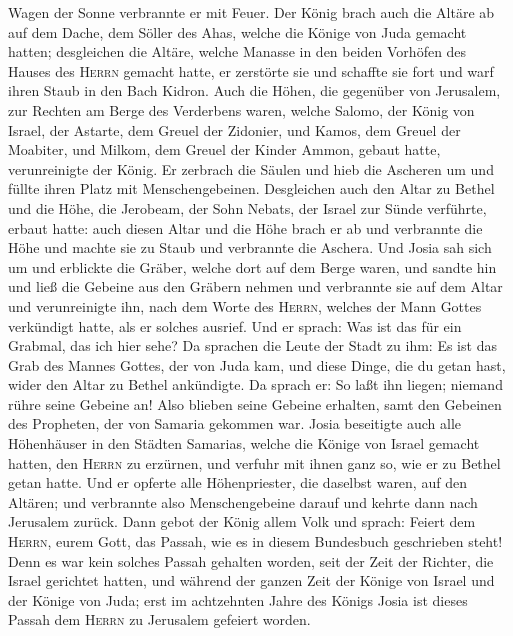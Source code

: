 Wagen der Sonne verbrannte er mit Feuer.  Der König brach
auch die Altäre ab auf dem Dache, dem Söller des Ahas, welche die Könige
von Juda gemacht hatten; desgleichen die Altäre, welche Manasse in den
beiden Vorhöfen des Hauses des \textsc{Herrn} gemacht hatte, er
zerstörte sie und schaffte sie fort und warf ihren Staub in den Bach
Kidron.  Auch die Höhen, die gegenüber von Jerusalem, zur
Rechten am Berge des Verderbens waren, welche Salomo, der König von
Israel, der Astarte, dem Greuel der Zidonier, und Kamos, dem Greuel der
Moabiter, und Milkom, dem Greuel der Kinder Ammon, gebaut hatte,
verunreinigte der König.  Er zerbrach die Säulen und hieb
die Ascheren um und füllte ihren Platz mit Menschengebeinen.
 Desgleichen auch den Altar zu Bethel und die Höhe, die
Jerobeam, der Sohn Nebats, der Israel zur Sünde verführte, erbaut hatte:
auch diesen Altar und die Höhe brach er ab und verbrannte die Höhe und
machte sie zu Staub und verbrannte die Aschera.  Und
Josia sah sich um und erblickte die Gräber, welche dort auf dem Berge
waren, und sandte hin und ließ die Gebeine aus den Gräbern nehmen und
verbrannte sie auf dem Altar und verunreinigte ihn, nach dem Worte des
\textsc{Herrn}, welches der Mann Gottes verkündigt hatte, als er solches
ausrief.  Und er sprach: Was ist das für ein Grabmal, das
ich hier sehe? Da sprachen die Leute der Stadt zu ihm: Es ist das Grab
des Mannes Gottes, der von Juda kam, und diese Dinge, die du getan hast,
wider den Altar zu Bethel ankündigte.  Da sprach er: So
laßt ihn liegen; niemand rühre seine Gebeine an! Also blieben seine
Gebeine erhalten, samt den Gebeinen des Propheten, der von Samaria
gekommen war.  Josia beseitigte auch alle Höhenhäuser in
den Städten Samarias, welche die Könige von Israel gemacht hatten, den
\textsc{Herrn} zu erzürnen, und verfuhr mit ihnen ganz so, wie er zu
Bethel getan hatte.  Und er opferte alle Höhenpriester,
die daselbst waren, auf den Altären; und verbrannte also Menschengebeine
darauf und kehrte dann nach Jerusalem zurück.  Dann gebot
der König allem Volk und sprach: Feiert dem \textsc{Herrn}, eurem Gott,
das Passah, wie es in diesem Bundesbuch geschrieben steht!
 Denn es war kein solches Passah gehalten worden, seit
der Zeit der Richter, die Israel gerichtet hatten, und während der
ganzen Zeit der Könige von Israel und der Könige von Juda;
 erst im achtzehnten Jahre des Königs Josia ist dieses
Passah dem \textsc{Herrn} zu Jerusalem gefeiert worden. 
